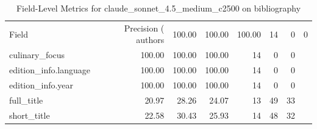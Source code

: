 \begin{table}
\caption{Field-Level Metrics for claude_sonnet_4.5_medium_c2500 on bibliography}
\label{tab:fields_claude_sonnet_4.5_medium_c2500_bibliography}
\begin{tabular}{lrrrrrr}
\toprule
Field & Precision (%
\midrule
authors & 100.00 & 100.00 & 100.00 & 14 & 0 & 0 \\
culinary_focus & 100.00 & 100.00 & 100.00 & 14 & 0 & 0 \\
edition_info.language & 100.00 & 100.00 & 100.00 & 14 & 0 & 0 \\
edition_info.year & 100.00 & 100.00 & 100.00 & 14 & 0 & 0 \\
full_title & 20.97 & 28.26 & 24.07 & 13 & 49 & 33 \\
short_title & 22.58 & 30.43 & 25.93 & 14 & 48 & 32 \\
\bottomrule
\end{tabular}
\end{table}
